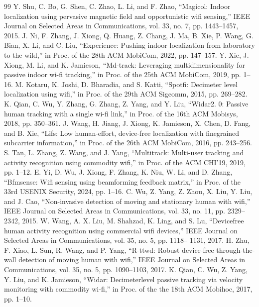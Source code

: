 \documentclass[journal]{IEEEtran}
\begin{document}

\begin{thebibliography}{99}
 Y. Shu, C. Bo, G. Shen, C. Zhao, L. Li, and F. Zhao, “Magicol: Indoor localization using pervasive magnetic field and opportunistic wifi sensing,” IEEE Journal on Selected Areas in Communications, vol. 33, no. 7, pp. 1443–1457, 2015.
 J. Ni, F. Zhang, J. Xiong, Q. Huang, Z. Chang, J. Ma, B. Xie, P. Wang, G. Bian, X. Li, and C. Liu, “Experience: Pushing indoor localization from laboratory to the wild,” in Proc. of the 28th ACM MobiCom, 2022, pp. 147–157.
 Y. Xie, J. Xiong, M. Li, and K. Jamieson, “Md-track: Leveraging multidimensionality for passive indoor wi-fi tracking,” in Proc. of the 25th ACM MobiCom, 2019, pp. 1–16.
 M. Kotaru, K. Joshi, D. Bharadia, and S. Katti, “Spotfi: Decimeter level localization using wifi,” in Proc. of the 29th ACM Sigcomm, 2015, pp. 269–282.
 K. Qian, C. Wu, Y. Zhang, G. Zhang, Z. Yang, and Y. Liu, “Widar2. 0: Passive human tracking with a single wi-fi link,” in Proc. of the 16th ACM Mobisys, 2018, pp. 350–361.
 J. Wang, H. Jiang, J. Xiong, K. Jamieson, X. Chen, D. Fang, and B. Xie, “Lifs: Low human-effort, device-free localization with finegrained subcarrier information,” in Proc. of the 26th ACM MobiCom, 2016, pp. 243–256.
 S. Tan, L. Zhang, Z. Wang, and J. Yang, “Multitrack: Multi-user tracking and activity recognition using commodity wifi,” in Proc. of the ACM CHI’19, 2019, pp. 1–12.
 E. Yi, D. Wu, J. Xiong, F. Zhang, K. Niu, W. Li, and D. Zhang, “Bfmsense: Wifi sensing using beamforming feedback matrix,” in Proc. of the 33rd USENIX Security, 2024, pp. 1–16.
 C. Wu, Z. Yang, Z. Zhou, X. Liu, Y. Liu, and J. Cao, “Non-invasive detection of moving and stationary human with wifi,” IEEE Journal on Selected Areas in Communications, vol. 33, no. 11, pp. 2329–2342, 2015.
 W. Wang, A. X. Liu, M. Shahzad, K. Ling, and S. Lu, “Devicefree human activity recognition using commercial wifi devices,” IEEE Journal on Selected Areas in Communications, vol. 35, no. 5, pp. 1118– 1131, 2017.
 H. Zhu, F. Xiao, L. Sun, R. Wang, and P. Yang, “R-ttwd: Robust device-free through-the-wall detection of moving human with wifi,” IEEE Journal on Selected Areas in Communications, vol. 35, no. 5, pp. 1090–1103, 2017.
 K. Qian, C. Wu, Z. Yang, Y. Liu, and K. Jamieson, “Widar: Decimeterlevel passive tracking via velocity monitoring with commodity wi-fi,” in Proc. of the the 18th ACM Mobihoc, 2017, pp. 1–10.

\end{thebibliography}
\end{document}
